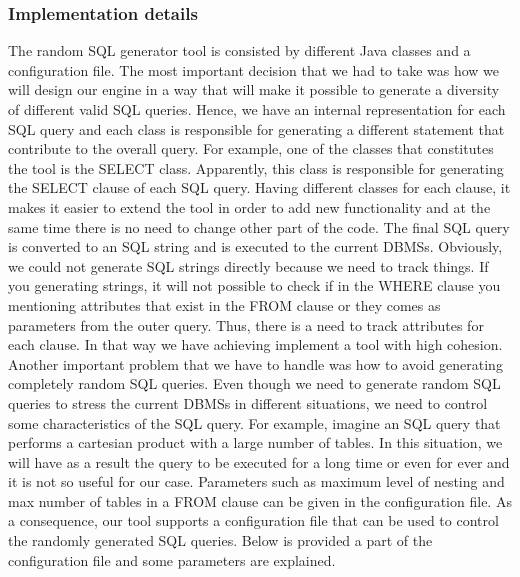 \subsubsection{Implementation details}
The random SQL generator tool is consisted by different Java classes and a configuration file. The most important decision that we had to take was how we will design our engine in a way that will make it possible to generate a diversity of different valid SQL queries. Hence, we have an internal representation for each SQL query and each class is responsible for generating a different statement  that contribute to the overall query. For example, one of the classes that constitutes the tool is the SELECT class. Apparently, this class is responsible for generating the SELECT clause of each SQL query. Having different classes for each clause, it makes it easier to extend the tool in order to add new functionality and at the same time there is no need to change other part of the code. The final SQL query is converted to an SQL string and is executed to the current DBMSs. Obviously, we could not generate SQL strings directly because we need to track things. If you generating strings, it will not possible to check if in the WHERE clause you mentioning attributes that exist in the FROM clause or they comes as parameters from the outer query. Thus, there is a need to track attributes for each clause. In that way we have achieving implement a tool with high cohesion.
Another important problem that we have to handle was how to avoid generating completely random SQL queries. Even though we need to generate random SQL queries to stress the current DBMSs in different situations, we need to control some characteristics of the SQL query. For example, imagine an SQL query that performs a cartesian product with a large number of tables. In this situation, we will have as a result the query to be executed for a long time or even for ever and it is not so useful for our case. Parameters such as maximum level of nesting and max number of tables in a FROM clause can be given in the configuration file. As a consequence, our tool supports a configuration file that can be used to control the randomly generated SQL queries. Below is provided a part of the configuration file and some parameters are explained.   


